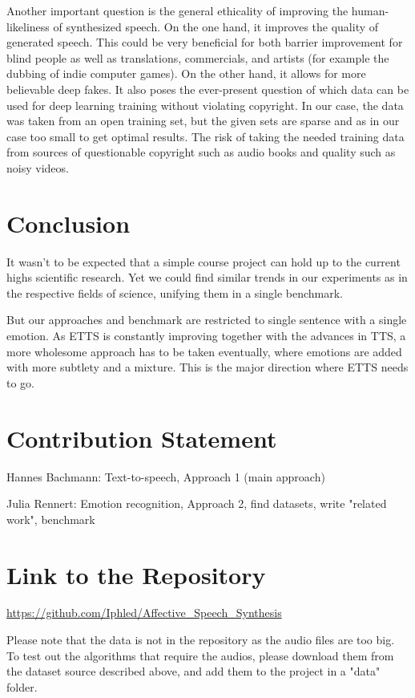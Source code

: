 \documentclass[11pt]{article}
\begin{document}
Another important question is the general ethicality of improving the human-likeliness of synthesized speech. On the one hand, it improves the quality of generated speech. This could be very beneficial for both barrier improvement for blind people as well as translations, commercials, and artists (for example the dubbing of indie computer games). On the other hand, it allows for more believable deep fakes. It also poses the ever-present question of which data can be used for deep learning training without violating copyright. In our case, the data was taken from an open training set, but the given sets are sparse and as in our case too small to get optimal results\cite{he_improve_2022}. The risk of taking the needed training data from sources of questionable copyright such as audio books and quality such as noisy videos.

\section{Conclusion}
\label{conclusion}
It wasn't to be expected that a simple course project can hold up to the current highs scientific research. Yet we could find similar trends in our experiments as in the respective fields of science, unifying them in a single benchmark.

But our approaches and benchmark are restricted to single sentence with a single emotion.
As ETTS is constantly improving together with the advances in TTS, a more wholesome approach has to be taken eventually, where emotions are added with more subtlety and a mixture. This is the major direction where ETTS needs to go.

\section{Contribution Statement}
Hannes Bachmann: Text-to-speech, Approach 1 (main approach)

Julia Rennert: Emotion recognition, Approach 2, find datasets, write "related work", benchmark

\section{Link to the Repository}
{\small\url{https://github.com/Iphled/Affective\_Speech\_Synthesis}}

Please note that the data is not in the repository as the audio files are too big. To test out the algorithms that require the audios, please download them from the dataset source described above, and add them to the project in a "data" folder.
\end{document}
